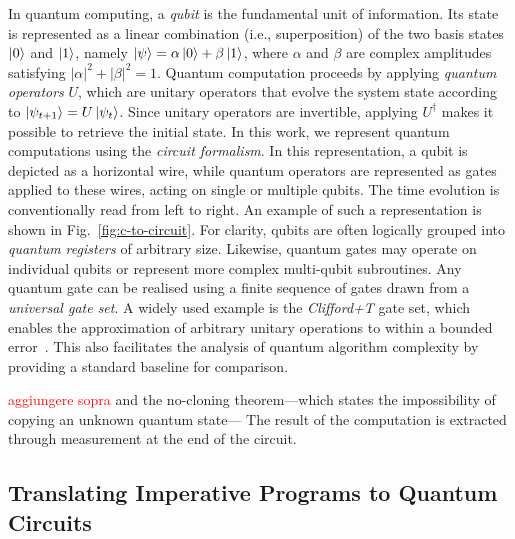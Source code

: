In quantum computing, a \emph{qubit} is the fundamental unit of information. Its state is represented as a linear combination (i.e., superposition) of the two basis states $\ket{0}$ and $\ket{1}$, namely $\ket{\psi} = \alpha \ket{0} + \beta \ket{1}$, where $\alpha$ and $\beta$ are complex amplitudes satisfying $|\alpha|^2 + |\beta|^2 = 1$.
Quantum computation proceeds by applying \emph{quantum operators} $U$, which are unitary operators that evolve the system state according to $\ket{\psi_{t+1}} = U \ket{\psi_t}$. Since unitary operators are invertible, applying $U^\dagger$ makes it possible to retrieve the initial state.
In this work, we represent quantum computations using the \emph{circuit formalism}. In this representation, a qubit is depicted as a horizontal wire, while quantum operators are represented as gates applied to these wires, acting on single or multiple qubits. The time evolution is conventionally read from left to right. An example of such a representation is shown in Fig.~\ref{fig:c-to-circuit}.
For clarity, qubits are often logically grouped into \emph{quantum registers} of arbitrary size. Likewise, quantum gates may operate on individual qubits or represent more complex multi-qubit subroutines.
Any quantum gate can be realised using a finite sequence of gates drawn from a \emph{universal gate set}. A widely used example is the \emph{Clifford+T} gate set, which enables the approximation of arbitrary unitary operations to within a bounded error~\cite{nielsen-chuang}.
This also facilitates the analysis of quantum algorithm complexity by providing a standard baseline for comparison.

\textcolor{red}{aggiungere sopra}
 and the no-cloning theorem—which states the impossibility of copying an unknown quantum state—
  The result of the computation is extracted through measurement at the end of the circuit.

\subsection{Translating Imperative Programs to Quantum Circuits}
\label{sec:c-to-quantum}

